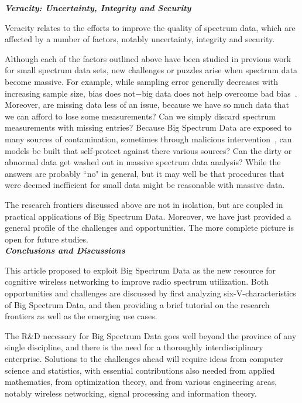\documentclass[12pt,draftcls,journal,letterpaper,oneside,onecolumn]{IEEEtran}
\begin{document}
\textbf{\emph{Veracity: Uncertainty, Integrity and Security}}

Veracity relates to the efforts to improve the quality of spectrum data, which are affected by a number of factors, notably uncertainty, integrity and security.

Although each of the factors outlined above have been studied in previous work for small spectrum data sets, new challenges or puzzles arise when spectrum data become massive. For example, while sampling error generally decreases with increasing sample size, bias does not$-$big data does not help overcome bad bias~\cite{Frontiers}. Moreover, are missing data less of an issue, because we have so much data that we can afford to lose some measurements? Can we simply discard spectrum measurements with missing entries? Because Big Spectrum Data are exposed to many sources of contamination, sometimes through malicious intervention~\cite{ShuiYu}, can models be built that self-protect against there various sources? Can the dirty or abnormal data get washed out in massive spectrum data analysis? While the answers are probably ``no" in general, but it may well be that procedures that were deemed inefficient for small data might be reasonable with massive data.








The research frontiers discussed above are not in isolation, but are coupled in practical applications of Big Spectrum Data. Moreover, we have just provided a general profile of the challenges and opportunities. The more complete picture is open for future studies.
\\

\textbf{\emph{Conclusions and Discussions}}

This article proposed to exploit Big Spectrum Data as the new resource for cognitive wireless networking to improve radio spectrum utilization. Both opportunities and challenges are discussed by first analyzing six-V-characteristics of Big Spectrum Data, and then providing a brief tutorial on the research frontiers as well as the emerging use cases.

The R$\&$D necessary for Big Spectrum Data goes well beyond the province of any single discipline, and there is the need for a thoroughly interdisciplinary enterprise. Solutions to the challenges ahead will require ideas from computer science and statistics, with essential contributions also needed from applied mathematics, from optimization theory, and from various engineering areas, notably wireless networking, signal processing and information theory.
\\
\end{document}

